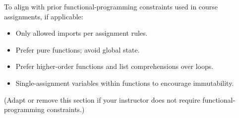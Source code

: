 To align with prior functional-programming constraints used in course assignments, if applicable:
\begin{itemize}
  \item Only allowed imports per assignment rules.
  \item Prefer pure functions; avoid global state.
  \item Prefer higher-order functions and list comprehensions over loops.
  \item Single-assignment variables within functions to encourage immutability.
\end{itemize}
(Adapt or remove this section if your instructor does not require functional-programming constraints.)
